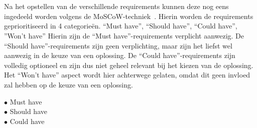 \section{}
\label{sec:Indelen requirements volgens MoSCoW-techniek}

Na het opstellen van de verschillende requirements kunnen deze nog eens ingedeeld worden volgens de MoSCoW-techniek~\autocite{Ahmad2017}. Hierin worden de requirements geprioritiseerd in 4 categorieën. “Must have”, “Should have”, “Could have”, ”Won't have” Hierin zijn de “Must have”-requirements verplicht aanwezig. De “Should have”-requirements zijn geen verplichting, maar zijn het liefst wel aanwezig in de keuze van een oplossing. De “Could have”-requirements zijn volledig optioneel en zijn dus niet geheel relevant bij het kiezen van de oplossing. Het “Won't have” aspect wordt hier achterwege gelaten, omdat dit geen invloed zal hebben op de keuze van een oplossing.

\begin{description}
    \item[$\bullet$ Must have] 
    \item[$\bullet$ Should have]
    \item[$\bullet$ Could have]
\end{description}

